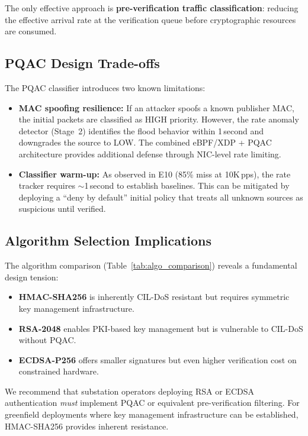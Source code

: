 \documentclass[journal]{IEEEtran}
\begin{document}
The only effective approach is \textbf{pre-verification traffic classification}: reducing the effective arrival rate at the verification queue before cryptographic resources are consumed.

\subsection{PQAC Design Trade-offs}
The PQAC classifier introduces two known limitations:
\begin{itemize}[leftmargin=*]
    \item \textbf{MAC spoofing resilience:} If an attacker spoofs a known publisher MAC, the initial packets are classified as HIGH priority. However, the rate anomaly detector (Stage~2) identifies the flood behavior within 1\,second and downgrades the source to LOW. The combined eBPF/XDP + PQAC architecture provides additional defense through NIC-level rate limiting.
    \item \textbf{Classifier warm-up:} As observed in E10 (85\% miss at 10K\,pps), the rate tracker requires $\sim$1\,second to establish baselines. This can be mitigated by deploying a ``deny by default'' initial policy that treats all unknown sources as suspicious until verified.
\end{itemize}

\subsection{Algorithm Selection Implications}
The algorithm comparison (Table~\ref{tab:algo_comparison}) reveals a fundamental design tension:
\begin{itemize}[leftmargin=*]
    \item \textbf{HMAC-SHA256} is inherently CIL-DoS resistant but requires symmetric key management infrastructure.
    \item \textbf{RSA-2048} enables PKI-based key management but is vulnerable to CIL-DoS without PQAC.
    \item \textbf{ECDSA-P256} offers smaller signatures but even higher verification cost on constrained hardware.
\end{itemize}

We recommend that substation operators deploying RSA or ECDSA authentication \emph{must} implement PQAC or equivalent pre-verification filtering. For greenfield deployments where key management infrastructure can be established, HMAC-SHA256 provides inherent resistance.
\end{document}
